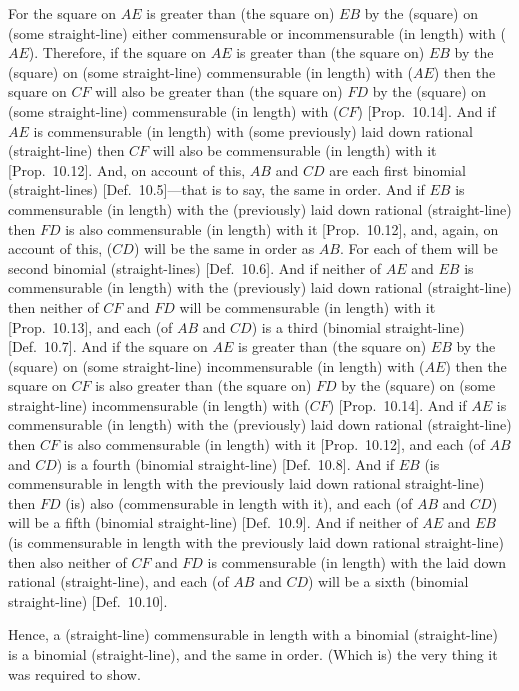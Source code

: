 For the square on $AE$ is  greater than (the square on) $EB$ by the
(square) on (some straight-line) either commensurable or incommensurable
(in length) with ($AE$).  Therefore, if the square on $AE$ is greater than (the square on)
$EB$ by the (square) on (some straight-line) commensurable (in length)
with ($AE$) then the square on $CF$ will also be greater than (the square on)
$FD$ by the (square) on (some straight-line) commensurable (in length)
with ($CF$) [Prop.~10.14]. And if $AE$
is commensurable (in length) with (some previously) laid down rational (straight-line) then $CF$ will also be commensurable (in length) with it [Prop.~10.12]. And, on account of this,
$AB$ and $CD$ are each first binomial (straight-lines) [Def.~10.5]---that is to say, the same  in order.
And if $EB$ is commensurable (in length) with the (previously) laid down
rational (straight-line) then $FD$ is also  commensurable (in length) with it [Prop.~10.12], and, again, on account of this,
($CD$) will be  the same in order as $AB$. For each of them will be second
binomial (straight-lines) [Def.~10.6]. And if neither
of $AE$ and $EB$ is commensurable (in length) with the (previously) laid down
rational (straight-line) then neither of $CF$ and $FD$ will be commensurable (in length)
with it [Prop.~10.13], and each (of $AB$ and $CD$) is a third (binomial straight-line) [Def.~10.7]. And if the square on $AE$
is greater than (the square on) $EB$ by the (square) on (some straight-line)
incommensurable (in length) with ($AE$) then the square on $CF$
is also greater than (the square on) $FD$ by the (square) on (some straight-line) incommensurable (in length) with ($CF$) [Prop.~10.14]. And if $AE$ is commensurable
(in length) with the (previously) laid down rational (straight-line) then $CF$ is also
commensurable (in  length) with it [Prop.~10.12], 
and each (of $AB$ and $CD$) is a fourth (binomial straight-line)
[Def.~10.8]. And
if $EB$ (is commensurable in length with the previously laid down rational
straight-line) then $FD$ (is) also (commensurable in length with it), and
each (of $AB$ and $CD$) will be a fifth (binomial straight-line) [Def.~10.9]. And if neither of $AE$ and  $EB$
(is commensurable in length with the previously laid down rational
straight-line) then also neither of $CF$ and $FD$ is   commensurable (in length) with the laid down rational (straight-line), and
each (of $AB$ and $CD$) will be a sixth (binomial straight-line) [Def.~10.10].

Hence, a (straight-line) commensurable in length with a binomial (straight-line) is a binomial (straight-line), and the same in order. (Which is) the
very thing it was required to show.

